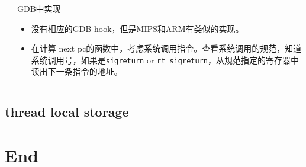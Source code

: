 \documentclass[cjk]{beamer}  %
\begin{document}
\begin{CJK}{UTF8}{gbsn}
\begin{frame}
\begin{columns}
\begin{overprint}
    \end{overprint}


    \column{5cm}
    \begin{overprint}

      \begin{block}{GDB中实现}
        \begin{itemize}
        \item 没有相应的GDB hook，但是MIPS和ARM有类似的实现。
        \item 在计算 next pc的函数中，考虑系统调用指令。查看系统调用的规范，知道系统调用号，如果是\texttt{sigreturn} or \texttt{rt\_sigreturn}，从规范指定的寄存器中读出下一条指令的地址。
        \end{itemize}
      \end{block}

    \end{overprint}
  \end{columns}
\end{frame}

\subsection{thread local storage}


\section{End}

\end{CJK}
\end{document}
